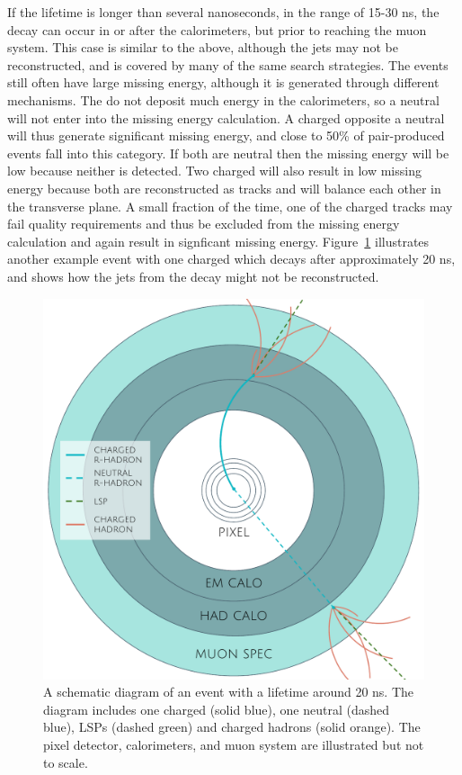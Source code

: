 If the lifetime is longer than several nanoseconds, in the range of 15-30 ns, the \rhadron decay can occur in or after the calorimeters, but prior to reaching the muon system.
This case is similar to the above, although the jets may not be reconstructed, and is covered by many of the same search strategies.
The events still often have large missing energy, although it is generated through different mechanisms.
The \rhadrons do not deposit much energy in the calorimeters, so a neutral \rhadron will not enter into the missing energy calculation.
A charged \rhadron opposite a neutral \rhadron will thus generate significant missing energy, and close to 50\% of pair-produced \rhadron events fall into this category.
If both \rhadrons are neutral then the missing energy will be low because neither is detected.
Two charged \rhadrons will also result in low missing energy because both are reconstructed as tracks and will balance each other in the transverse plane.
A small fraction of the time, one of the charged \rhadron tracks may fail quality requirements and thus be excluded from the missing energy calculation and again result in signficant missing energy.
Figure~\ref{fig:rhadron_metastable_long} illustrates another example event with one charged \rhadron which decays after approximately 20 ns, and shows how the jets from the decay might not be reconstructed.

\begin{figure}[h!]
\centering
\includegraphics[width=\halffig]{figures/rhadron_metastable_long.pdf}
\caption{A schematic diagram of an \rhadron event with a lifetime around 20 ns. The diagram includes one charged \rhadron (solid blue), one neutral \rhadron (dashed blue), \acp{LSP} (dashed green) and charged hadrons (solid orange). The pixel detector, calorimeters, and muon system are illustrated but not to scale.}
\label{fig:rhadron_metastable_long}
\end{figure}


